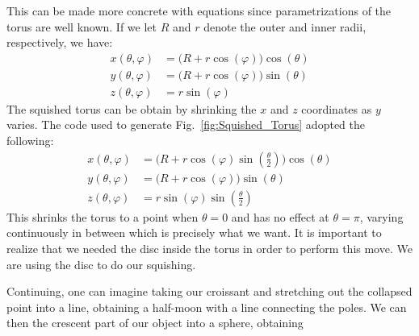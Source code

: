 \documentclass{book}                                                           %
\begin{document}
                This can be made more concrete with equations since
                parametrizations of the torus are well known. If we let $R$ and
                $r$ denote the outer and inner radii, respectively, we have:
                \begin{subequations}
                    \begin{align}
                        x(\theta,\varphi)
                            &=\big(R+r\cos(\varphi)\big)\cos(\theta)\\
                        y(\theta,\varphi)
                            &=\big(R+r\cos(\varphi)\big)\sin(\theta)\\
                        z(\theta,\varphi)&=r\sin(\varphi)
                    \end{align}
                \end{subequations}
                The squished torus can be obtain by shrinking the $x$ and $z$
                coordinates as $y$ varies. The code used to generate
                Fig.~\ref{fig:Squished_Torus} adopted the following:
                \begin{subequations}
                    \begin{align}
                        x(\theta,\varphi)
                            &=\big(R+r\cos(\varphi)\sin(\tfrac{\theta}{2})\big)
                                \cos(\theta)\\
                        y(\theta,\varphi)
                            &=\big(R+r\cos(\varphi)\big)\sin(\theta)\\
                        z(\theta,\varphi)
                            &=r\sin(\varphi)\sin(\tfrac{\theta}{2})
                    \end{align}
                \end{subequations}
                This shrinks the torus to a point when $\theta=0$ and has no
                effect at $\theta=\pi$, varying continuously in between which is
                precisely what we want. It is important to realize that we
                needed the disc inside the torus in order to perform this move.
                We are using the disc to do our squishing.
                \par\hfill\par
                Continuing, one can imagine taking our croissant and stretching
                out the collapsed point into a line, obtaining a half-moon with
                a line connecting the poles. We can then the crescent part of
                our object into a sphere, obtaining
\end{document}
